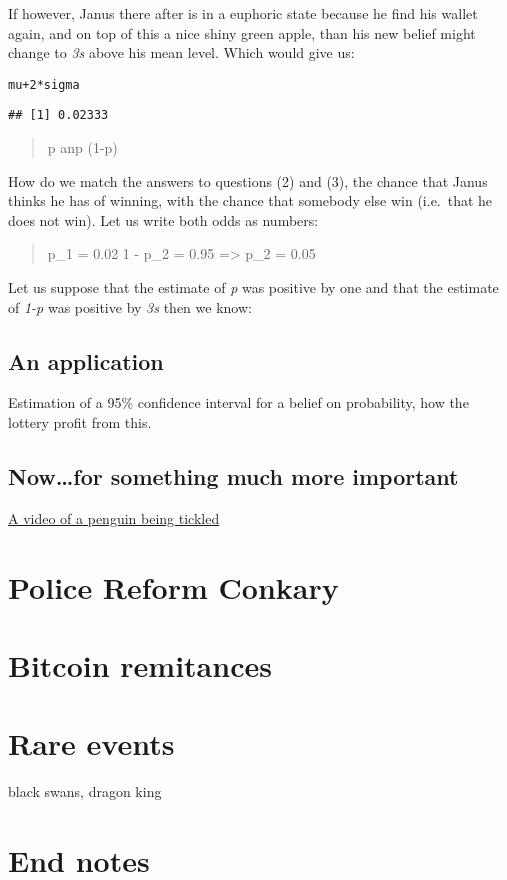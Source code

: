 \documentclass[a4paper]{book}\usepackage{graphicx, color}
\makeatletter
\newenvironment{kframe}{%
 \def\at@end@of@kframe{}%
 \ifinner\ifhmode%
  \def\at@end@of@kframe{\end{minipage}}%
  \begin{minipage}{\columnwidth}%
 \fi\fi%
 \def\FrameCommand##1{\hskip\@totalleftmargin \hskip-\fboxsep
 \colorbox{shadecolor}{##1}\hskip-\fboxsep
     \hskip-\linewidth \hskip-\@totalleftmargin \hskip\columnwidth}%
 \MakeFramed {\advance\hsize-\width
   \@totalleftmargin\z@ \linewidth\hsize
   \@setminipage}}%
 {\par\unskip\endMakeFramed%
 \at@end@of@kframe}
\newenvironment{knitrout}{}{} %
\makeatother
\begin{document}
If however, Janus there after is in a euphoric state because he find his
wallet again, and on top of this a nice shiny green apple, than his new
belief might change to \emph{3s} above his mean level. Which would give
us:

\begin{knitrout}
\color{fgcolor}\begin{kframe}
\begin{alltt}
mu + 2 * sigma
\end{alltt}
\begin{verbatim}
## [1] 0.02333
\end{verbatim}
\end{kframe}
\end{knitrout}


\begin{quote}
p anp (1-p)
\end{quote}

How do we match the answers to questions (2) and (3), the chance that
Janus thinks he has of winning, with the chance that somebody else win
(i.e.~that he does not win). Let us write both odds as numbers:

\begin{quote}
p\_1 = 0.02 1 - p\_2 = 0.95 =\textgreater{} p\_2 = 0.05
\end{quote}

Let us suppose that the estimate of \emph{p} was positive by one and
that the estimate of \emph{1-p} was positive by \emph{3s} then we know:


\section{An application}

Estimation of a 95\% confidence interval for a belief on probability,
how the lottery profit from this.

\section{Now\ldots{}for something much more important}

\href{http://www.youtube.com/watch?v=FVwtTrlPSSk}{A video of a penguin
being tickled}


\chapter{Police Reform Conkary}


\chapter{Bitcoin remitances}


\chapter{Rare events}
black swans, dragon king

\begin{refsection}

\parencite{morris1998unique}
\printbibliography
\end{refsection}

\backmatter
\chapter{End notes}
\end{document}
